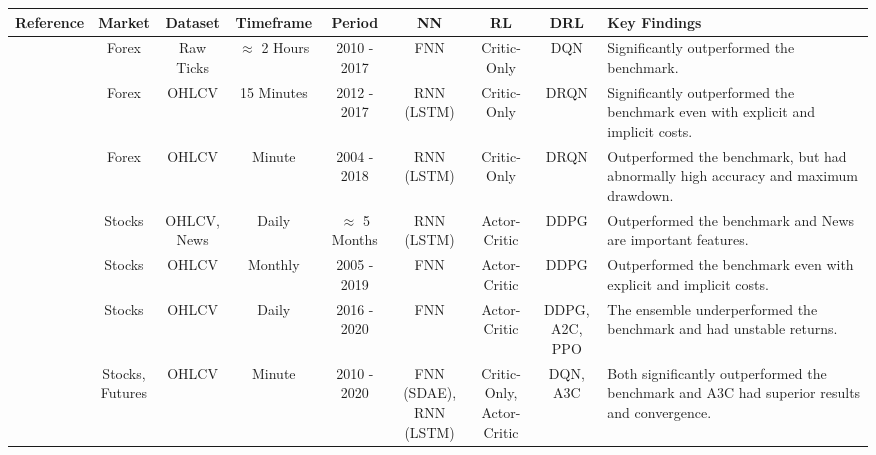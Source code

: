 \begin{table}
\centering
\footnotesize
\begin{tabularx}{\linewidth}{@{}ccccccccX@{}}
\toprule
\textbf{Reference} & \textbf{Market} & \textbf{Dataset} & \textbf{Timeframe} & \textbf{Period} & \textbf{NN} & \textbf{RL} & \textbf{DRL} & \textbf{Key Findings} \\
\midrule

\cite{carapuco_reinforcement_2018} & Forex & Raw Ticks & \(\approx\) 2 Hours & 2010 - 2017 & FNN & Critic-Only & DQN & Significantly outperformed the benchmark. \\

\cite{huang_financial_2018} & Forex & OHLCV & 15 Minutes & 2012 - 2017 & RNN (LSTM) & Critic-Only & DRQN & Significantly outperformed the benchmark even with explicit and implicit costs. \\

\cite{rundo_deep_2019} & Forex & OHLCV & Minute & 2004 - 2018 & RNN (LSTM) & Critic-Only & DRQN & Outperformed the benchmark, but had abnormally high accuracy and maximum drawdown. \\

\cite{saini_stock_2019} & Stocks & \makecell{OHLCV, \\ News} & Daily & \(\approx\) 5 Months & RNN (LSTM) & Actor-Critic & DDPG & Outperformed the benchmark and News are important features. \\

\cite{gran_deep_2019} & Stocks & OHLCV & Monthly & 2005 - 2019 & FNN & Actor-Critic & DDPG & Outperformed the benchmark even with explicit and implicit costs. \\

\cite{kong_empirical_2023} & Stocks & OHLCV & Daily & 2016 - 2020 & FNN & Actor-Critic & \makecell{DDPG, \\ A2C, PPO} & The ensemble underperformed the benchmark and had unstable returns. \\

\cite{li_deep_2019} & \makecell{Stocks, \\ Futures} & OHLCV & Minute & 2010 - 2020 & \makecell{FNN (SDAE), \\ RNN (LSTM)} & \makecell{Critic-Only, \\ Actor-Critic} & DQN, A3C & Both significantly outperformed the benchmark and A3C had superior results and convergence. \\


\end{tabularx}
\end{table}
